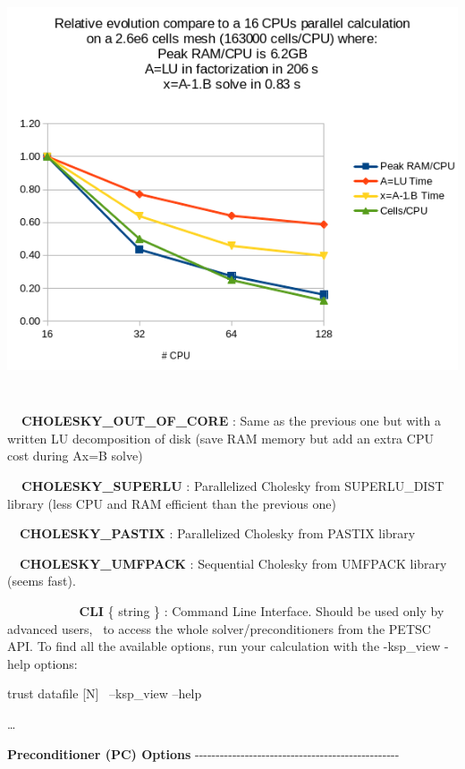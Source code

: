 \begin{center}
\includegraphics[width=15.212cm,height=12.266cm]{petsc_graph.png}
\end{center}
\textbf{\ \ CHOLESKY\_OUT\_OF\_CORE }: Same as the previous one but with a written LU decomposition of disk (save RAM
memory but add an extra CPU cost during Ax=B solve)

\textbf{\ \ CHOLESKY\_SUPERLU }: Parallelized Cholesky from SUPERLU\_DIST library (less CPU and RAM
efficient than the previous one) 

\ \ \textbf{CHOLESKY\_PASTIX} : Parallelized Cholesky from PASTIX library

\ \ \textbf{CHOLESKY\_UMFPACK} : Sequential Cholesky from UMFPACK library (seems fast).

\textbf{\ \ \ \ \ \ \ \ \ \ CLI }\{ string \} : Command Line Interface. Should be used only by advanced
users, \ to access the whole solver/preconditioners from the PETSC API. To find all the available options, run your
calculation with the -ksp\_view -help options:


\bigskip

trust datafile [N] \ {}--ksp\_view --help

{\dots}

\textbf{Preconditioner (PC) Options}
-{}-{}-{}-{}-{}-{}-{}-{}-{}-{}-{}-{}-{}-{}-{}-{}-{}-{}-{}-{}-{}-{}-{}-{}-{}-{}-{}-{}-{}-{}-{}-{}-{}-{}-{}-{}-{}-{}-{}-{}-{}-{}-{}-{}-{}-{}-{}-{}-

